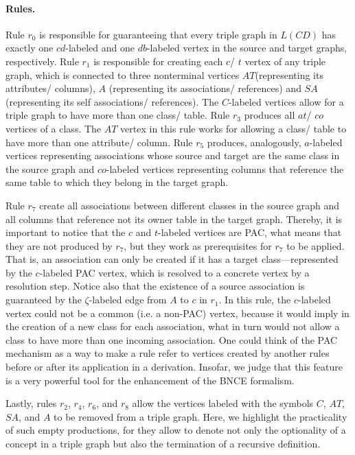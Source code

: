 \paragraph*{Rules. } Rule $r_0$ is responsible for guaranteeing that every triple graph in $L(CD)$ has exactly one $cd$-labeled and one $db$-labeled vertex in the source and target graphs, respectively. Rule $r_1$ is responsible for creating each $c$/ $t$ vertex of any triple graph, which is connected to three nonterminal vertices $AT$(representing its attributes/ columns), $A$ (representing its associations/ references) and $SA$ (representing its self associations/ references). The $C$-labeled vertices allow for a triple graph to have more than one class/ table. Rule $r_3$ produces all $at$/ $co$ vertices of a class. The $AT$ vertex in this rule works for allowing a class/ table to have more than one attribute/ column. Rule $r_5$ produces, analogously, $a$-labeled vertices representing associations whose source and target are the same class in the source graph and $co$-labeled vertices representing columns that reference the same table to which they belong in the target graph. 

Rule $r_7$ create all associations between different classes in the source graph and all columns that reference not its owner table in the target graph. Thereby, it is important to notice that the $c$ and $t$-labeled vertices are PAC, what means that they are not produced by $r_7$, but they work as prerequisites for $r_7$ to be applied. That is, an association can only be created if it has a target class---represented by the $c$-labeled PAC vertex, which is resolved to a concrete vertex by a resolution step. Notice also that the existence of a source association is guaranteed by the $\zeta$-labeled edge from $A$ to $c$ in $r_1$. In this rule, the $c$-labeled vertex could not be a common (i.e. a non-PAC) vertex, because it would imply in the creation of a new class for each association, what in turn would not allow a class to have more than one incoming association. One could think of the PAC mechanism as a way to make a rule refer to vertices created by another rules before or after its application in a derivation. Insofar, we judge that this feature is a very powerful tool for the enhancement of the BNCE formalism.

Lastly, rules $r_2$, $r_4$, $r_6$, and $r_8$ allow the vertices labeled with the symbols $C$, $AT$, $SA$, and $A$ to be removed from a triple graph. Here, we highlight the practicality of such empty productions, for they allow to denote not only the optionality of a concept in a triple graph but also the termination of a recursive definition.

